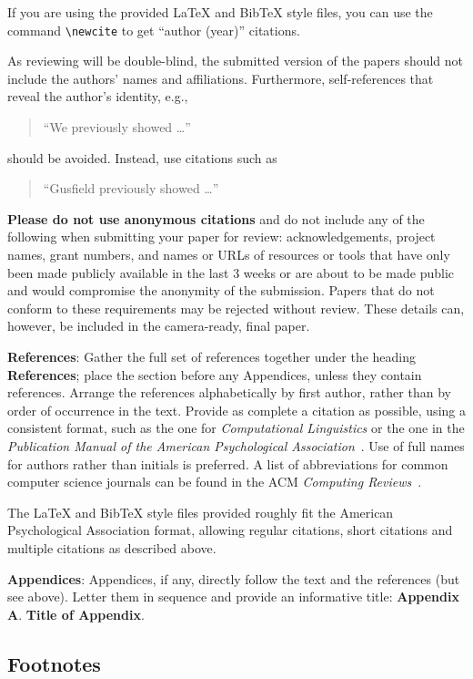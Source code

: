 \documentclass[11pt]{article}
\begin{document}
If you are using the provided LaTeX and BibTeX style files, you
can use the command \verb|\newcite| to get ``author (year)'' citations.

As reviewing will be double-blind, the submitted version of the papers should not include the authors' names and affiliations. Furthermore, self-references that reveal the author's identity, e.g.,
\begin{quote}
``We previously showed \cite{Gusfield:97} \ldots''  
\end{quote}
should be avoided. Instead, use citations such as 
\begin{quote}
``Gusfield 
previously showed \ldots''
\end{quote}

{\bf Please do not use anonymous citations} and do not include any of the following when submitting your paper for review: acknowledgements, project names, grant numbers, and names or URLs of resources or tools that have only been made publicly available in the last 3 weeks or are about to be made public and would compromise the anonymity of the submission.
Papers that do not conform to these requirements may be rejected without review. These details can, however, be included in the camera-ready, final paper.

{\bf References}: Gather the full set of references together under the heading {\bf References}; place the section before any Appendices, unless they contain references. Arrange the references alphabetically by first author, rather than by order of occurrence in the text. Provide as complete a citation as possible, using a consistent format, such as the one for {\em Computational Linguistics\/} or the one in the {\em Publication Manual of the American Psychological Association\/}~\cite{APA:83}. Use of full names for authors rather than initials is preferred. A list of abbreviations for common computer science journals can be found in the ACM {\em Computing Reviews\/}~\cite{ACM:83}.

The LaTeX and BibTeX style files provided roughly fit the
American Psychological Association format, allowing regular citations, short citations and multiple citations as described above.

{\bf Appendices}: Appendices, if any, directly follow the text and the references (but see above).  Letter them in sequence and provide an informative title: {\bf Appendix A}. {\bf Title of Appendix}.


\subsection{Footnotes}
\end{document}
